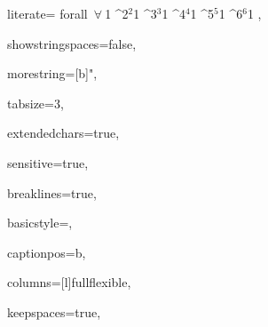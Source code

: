 {%
 literate=
	{forall\ }{{$\forall\ \!$}}1
	{^2}{{$^2$}}1
	{^3}{{$^3$}}1
	{^4}{{$^4$}}1
	{^5}{{$^5$}}1
	{^6}{{$^6$}}1
,


showstringspaces=false,

morestring=[b]",

tabsize=3,

extendedchars=true,

sensitive=true,

breaklines=true,

basicstyle=\ttfamily\footnotesize,

captionpos=b,

columns=[l]fullflexible,

keepspaces=true,

}
